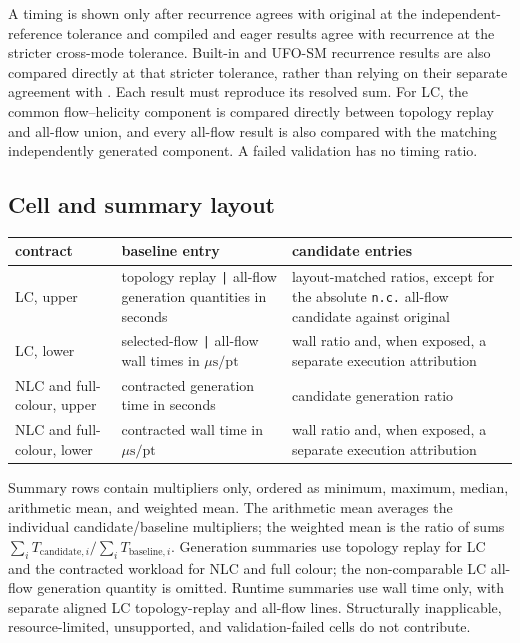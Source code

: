 A timing is shown only after recurrence agrees with original \AC{} at the
independent-reference tolerance and compiled and eager results agree with
recurrence at the stricter cross-mode tolerance. Built-in and UFO-SM recurrence
results are also compared directly at that stricter tolerance, rather than
relying on their separate agreement with \AC{}. Each result must reproduce its
resolved sum. For LC, the common flow--helicity component is compared directly
between topology replay and all-flow union, and every \PAC{} all-flow result is
also compared with the matching independently generated \AC{} component. A
failed validation has no timing ratio.

\subsection*{Cell and summary layout}

\begin{center}
\small
\begin{tabular}{@{}L{0.95in}L{2.45in}L{5.75in}@{}}
\toprule
\textbf{contract} & \textbf{baseline entry} & \textbf{candidate entries} \\
\midrule
LC, upper
  & topology replay \texttt{|} all-flow generation quantities in seconds
  & layout-matched ratios, except for the absolute \texttt{n.c.} all-flow
    candidate against original \AC{} \\
LC, lower
  & selected-flow \texttt{|} all-flow wall times in
    \(\mu\mathrm{s}/\mathrm{pt}\)
  & wall ratio and, when exposed, a separate execution attribution \\
NLC and full-colour, upper
  & contracted generation time in seconds
  & candidate generation ratio \\
NLC and full-colour, lower
  & contracted wall time in \(\mu\mathrm{s}/\mathrm{pt}\)
  & wall ratio and, when exposed, a separate execution attribution \\
\bottomrule
\end{tabular}
\end{center}

Summary rows contain multipliers only, ordered as minimum, maximum, median,
arithmetic mean, and weighted mean.  The arithmetic mean averages the
individual candidate/baseline multipliers; the weighted mean is the ratio of
sums
\(\sum_i T_{\mathrm{candidate},i}/\sum_i T_{\mathrm{baseline},i}\).
Generation summaries use topology replay for LC and the contracted workload
for NLC and full colour; the non-comparable LC all-flow generation quantity is
omitted.  Runtime summaries use wall time only, with separate aligned LC
topology-replay and all-flow lines.  Structurally inapplicable,
resource-limited, unsupported, and validation-failed cells do not contribute.

